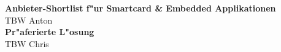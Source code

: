 \textbf{Anbieter-Shortlist f"ur Smartcard \& Embedded Applikationen}\\
TBW Anton\\

\textbf{Pr"aferierte L"osung}\\
TBW Chris\\